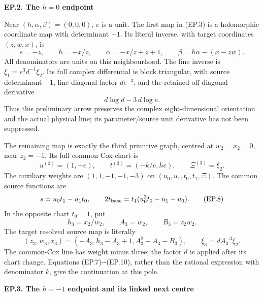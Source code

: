 \par

\medskip\noindent\textbf{EP.2. The \(h=0\) endpoint}

\par\nobreak

Near \((h,\alpha,\beta)=(0,0,0)\), \(e\) is a unit. The first
map in (EP.3) is a holomorphic coordinate map with determinant
\(-1\). Its literal inverse, with target coordinates \((z,w,x)\),
is
\[
 e=-z,\qquad h=-x/z,\qquad
 \alpha=-x/z+z+1,\qquad
 \beta=h\alpha-(x-zw).
 \tag{EP.5}
\]
All denominators are units on this neighbourhood. The line inverse
is \(\xi_1=e^3d^{-1}\xi_2\). Its full complex differential is
block triangular, with source determinant \(-1\), line diagonal
factor \(de^{-3}\), and the retained off-diagonal derivative
\[
 d\log d-3\,d\log e .
 \tag{EP.6}
\]
Thus this preliminary arrow preserves the complex eight-dimensional
orientation and the actual physical line; its parameter/source
unit derivative has not been suppressed.

The remaining map is exactly the third primitive graph, centred
at \(w_2=x_2=0\), near \(z_2=-1\). Its full common Cox chart is
\[
 u^{(3)}=(1,-e),\qquad
 t^{(3)}=(-k/e,he),\qquad \Xi^{(3)}=\xi_2 .
 \tag{EP.7}
\]
The auxiliary weights are \((1,1,-1,-1,-3)\) on
\((u_0,u_1,t_0,t_1,\Xi)\). The common source functions are
\[
 s=u_0t_1-u_1t_0,\qquad
 2t_{\rm base}=t_1(u_0^2t_0-u_1-u_0).
 \tag{EP.8}
\]
In the opposite chart \(t_0=1\), put
\[
 h_3=x_2/w_2,\qquad A_3=w_2,\qquad B_3=z_2w_2.
 \tag{EP.9}
\]
The target resolved source map is literally
\[
 (z_3,w_3,x_3)=(-A_3,h_3-A_3+1,A_3^2-A_3-B_3),
 \qquad \xi_3=dA_3^{-3}\xi_2 .
 \tag{EP.10}
\]
The common-Cox line has weight minus three; the factor \(d\)
is applied after its chart change. Equations (EP.7)-\/-(EP.10),
rather than the rational expression with denominator \(k\),
give the continuation at this pole.

\par

\medskip\noindent\textbf{EP.3. The \(h=-1\) endpoint and its linked next centre}

\par\nobreak

